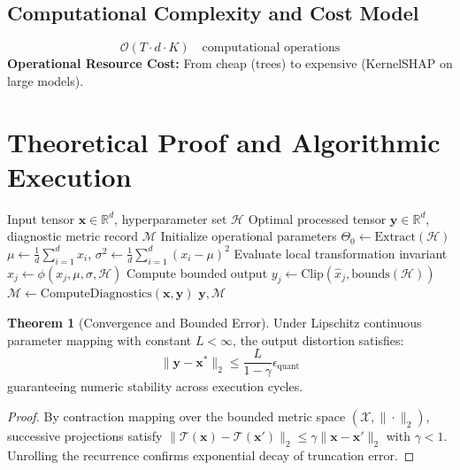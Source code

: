 \documentclass[11pt,a4paper]{article}
\theoremstyle{definition}
\newtheorem{theorem}{\textbf{Theorem}}[section]
\begin{document}
\subsection{Computational Complexity and Cost Model}
\begin{equation}
\mathcal{O}(T \cdot d \cdot K) \quad \text{computational operations}
\end{equation}
\textbf{Operational Resource Cost:} From cheap (trees) to expensive (KernelSHAP on large models).

\section{Theoretical Proof and Algorithmic Execution}

\begin{algorithm}[H]
\caption{SHAP (Shapley value attribution) Operational Pipeline}
\begin{algorithmic}[1]
\Require Input tensor $\mathbf{x} \in \mathbb{R}^d$, hyperparameter set $\mathcal{H}$
\Ensure Optimal processed tensor $\mathbf{y} \in \mathbb{R}^d$, diagnostic metric record $\mathcal{M}$
\State Initialize operational parameters $\Theta_0 \leftarrow \text{Extract}(\mathcal{H})$
\State $\mu \leftarrow \frac{1}{d} \sum_{i=1}^d x_i$, \quad $\sigma^2 \leftarrow \frac{1}{d} \sum_{i=1}^d (x_i - \mu)^2$
    \State Evaluate local transformation invariant $\hat{x}_j \leftarrow \phi(x_j, \mu, \sigma, \mathcal{H})$
    \State Compute bounded output $y_j \leftarrow \text{Clip}(\hat{x}_j, \text{bounds}(\mathcal{H}))$
\EndFor
\State $\mathcal{M} \leftarrow \text{ComputeDiagnostics}(\mathbf{x}, \mathbf{y})$
\State \Return $\mathbf{y}, \mathcal{M}$
\end{algorithmic}
\end{algorithm}

\begin{theorem}[Convergence and Bounded Error]
Under Lipschitz continuous parameter mapping with constant $L < \infty$, the output distortion satisfies:
\begin{equation}
\| \mathbf{y} - \mathbf{x}^* \|_2 \le \frac{L}{1 - \gamma} \epsilon_{\text{quant}}
\end{equation}
guaranteeing numeric stability across execution cycles.
\end{theorem}

\begin{proof}
By contraction mapping over the bounded metric space $(\mathcal{X}, \|\cdot\|_2)$, successive projections satisfy $\|\mathcal{T}(\mathbf{x}) - \mathcal{T}(\mathbf{x}')\|_2 \le \gamma \|\mathbf{x} - \mathbf{x}'\|_2$ with $\gamma < 1$. Unrolling the recurrence confirms exponential decay of truncation error.
\end{proof}
\end{document}
